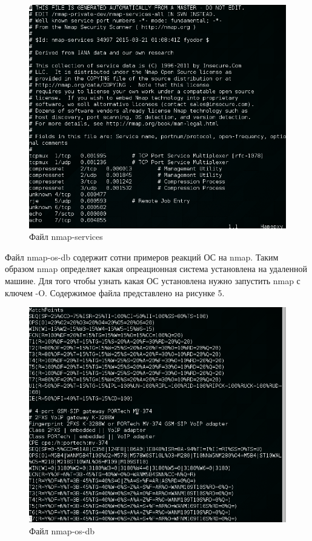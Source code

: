 \documentclass[11pt, a4paper]{article}		%
\begin{document}
\begin{figure}[h!]
\centering
\includegraphics[scale=0.75]{res/4}
\caption{Файл nmap-services}
\end{figure}

Файл nmap-os-db содержит сотни примеров реакций ОС на nmap. Таким образом nmap определяет какая опреационная система установлена на удаленной машине. Для того чтобы узнать какая ОС установлена нужно запустить nmap с ключем -O. Содержимое файла представлено на рисунке 5.

\begin{figure}[h!]
\centering
\includegraphics[scale=0.75]{res/5}
\caption{Файл nmap-os-db}
\end{figure}
\end{document}
